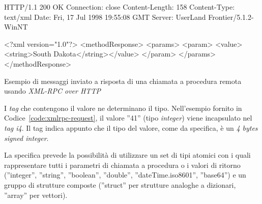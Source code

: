 \begin{program}
\begin{verbatimtab}
HTTP/1.1 200 OK
Connection: close
Content-Length: 158
Content-Type: text/xml
Date: Fri, 17 Jul 1998 19:55:08 GMT
Server: UserLand Frontier/5.1.2-WinNT


<?xml version="1.0"?>
<methodResponse>
   <params>
      <param>
         <value><string>South Dakota</string></value>
         </param>
      </params>
   </methodResponse>
\end{verbatimtab}
\caption{Esempio di messaggi inviato a risposta di una chiamata a procedura remota usando \emph{XML-RPC over HTTP}}\label{code:xmlrpc-response}
\end{program}

I \emph{tag} che contengono il valore ne determinano il tipo. Nell'esempio fornito in Codice~\ref{code:xmlrpc-request}, il valore ''41'' (tipo \emph{integer}) viene incapsulato nel \emph{tag i4}. Il tag indica appunto che il tipo del valore, come da specifica, è un \emph{4 bytes signed integer}.

La specifica prevede la possibilità di utilizzare un set di tipi atomici con i quali rappresentare tutti i parametri di chiamata a procedura o i valori di ritorno (''integer'', ''string'', ''boolean'', ''double'', ''dateTime.iso8601'', ''base64'') e un gruppo di strutture composte (''struct'' per strutture analoghe a dizionari, ''array'' per vettori).~\cite{xmlrpcspec}
